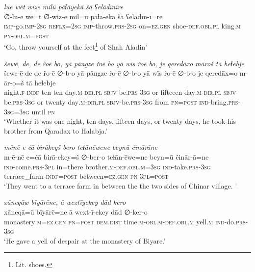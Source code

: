 \ea \label{DG.27}
\textit{lue wēt wize milū pāɫāyekā šā ʕelādīnīre} \\ 
\gll ∅-lu-e wē=t ∅-wiz-e mil=ū pāɫā-ekā šā ʕelādīn-ī=re \\ 
 \textsc{imp-}go.\textsc{imp-}\textsc{2sg} \textsc{reflx}\textsc{=\textsc{2sg}} \textsc{imp-}throw\textsc{.prs}-\textsc{2sg} on\textsc{=ez}\textsc{.gen} shoe\textsc{-def}\textsc{.obl}\textsc{.pl} king\textsc{.m} \textsc{pn}\textsc{-obl}\textsc{.m}\textsc{=\textsc{post}} \\ 
\glt `Go, throw yourself at the feet\footnote{Lit. shoes.} of Shah Aladin'
\z 
 
\ea \label{DG.29}
\textit{šewē, de, de řoē bo, yā pāngze řoē bo yā wīs řoē bo, je qeredāxo māroš tā heɫebje} \\ 
\gll šewe-ē de de řo-ē ∅-b-o yā pāngze řo-ē ∅-b-o yā wīs řo-ē ∅-b-o je qeredāx=o m-ār-o=š tā heɫebje \\ 
 night\textsc{\textsc{.f}}\textsc{-indf} ten ten day\textsc{.m}\textsc{-dir}\textsc{.pl} \textsc{sbjv-}be\textsc{.prs}\textsc{-3sg} or fifteeen day\textsc{.m}\textsc{-dir}\textsc{.pl} \textsc{sbjv-}be\textsc{.prs}\textsc{-3sg} or twenty day\textsc{.m}\textsc{-dir}\textsc{.pl} \textsc{sbjv-}be\textsc{.prs}\textsc{-3sg} from \textsc{pn}\textsc{=\textsc{post}} \textsc{ind-}bring\textsc{.prs}\textsc{-3sg}\textsc{=3sg} until \textsc{pn} \\ 
\glt `Whether it was one night, ten days, fifteen days, or twenty days, he took his brother from Qaradax to Halabja.'
\z 
 
\ea \label{DG.31}
\textit{mēnē e čā birākeyš bero teɫānēwene beynū činārāne} \\ 
\gll m-ē-nē e=čā birā-ekey=š ∅-ber-o teɫān-ēwe=ne beyn=ū činār-ā=ne \\ 
 \textsc{ind-}come\textsc{.prs}\textsc{-3pl} in=there brother\textsc{.m}\textsc{-def}\textsc{.obl}\textsc{.m}\textsc{=3sg} \textsc{ind-}take\textsc{.prs}\textsc{-3sg} terrace\_farm\textsc{-indf}\textsc{=\textsc{post}} between\textsc{=ez}\textsc{.gen} \textsc{pn}\textsc{-3pl}\textsc{=\textsc{post}} \\ 
\glt `They went to a terrace farm in between the the two sides of Chinar village. '
\z 
 
\ea \label{DG.33}
\textit{xāneqāw bīyārēne, ā wextīyekey dāđ kero} \\ 
\gll xāneqā=ū bīyārē=ne ā wext-ī-ekey dāđ ∅-ker-o \\ 
 monastery\textsc{.m}\textsc{=ez}\textsc{.gen} \textsc{pn}\textsc{=\textsc{post}} \textsc{dem.dist} time\textsc{.m}\textsc{-obl}\textsc{.m}\textsc{-def}\textsc{.obl}\textsc{.m} yell\textsc{.m} \textsc{ind-}do\textsc{.prs}\textsc{-3sg} \\ 
\glt `He gave a yell of despair at the monastery of Biyare.'
\z 
 
